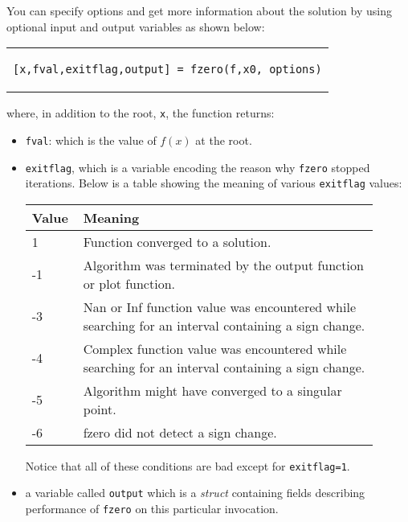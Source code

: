 You can specify options and get more information about the solution by using optional input and output variables as shown below:
\begin{center}
\begin{tabular}{c}
\begin{lstlisting}[style=myMatlab, frame=none, numbers=none, basicstyle=\large]
[x,fval,exitflag,output] = fzero(f,x0, options)
\end{lstlisting}
\end{tabular}
\end{center}
where, in addition to the root, \lstinline[style=myMatlab]{x}, the function returns:
\begin{itemize}
\item \lstinline[style=myMatlab]{fval}: which is the value of $f(x)$ at the root.

\item \lstinline[style=myMatlab]{exitflag}, which is a variable encoding the reason why \lstinline[style=myMatlab]{fzero} stopped iterations.  Below is a table showing the meaning of various \lstinline[style=myMatlab]{exitflag} values:

\begin{center}
\begin{tabular}{|p{0.1\linewidth} | p{0.8\linewidth}|}
\hline
\textbf{Value} & \textbf{Meaning} \\ \hline
1 & Function converged to a solution. \\
-1 & Algorithm was terminated by the output function or plot function. \\
-3 & Nan or Inf function value was encountered while searching for an interval containing a sign change. \\
-4 & Complex function value was encountered while searching for an interval containing a sign change. \\
-5 & Algorithm might have converged to a singular point. \\
-6 & fzero did not detect a sign change. \\
\hline
\end{tabular}
\end{center} 
Notice that all of these conditions are bad except for \lstinline[style=myMatlab]{exitflag=1}.

\vspace{5.0cm}

\item a variable called \lstinline[style=myMatlab]{output} which is a \emph{struct} containing fields describing performance of \lstinline[style=myMatlab]{fzero} on this particular invocation.



\end{itemize}
